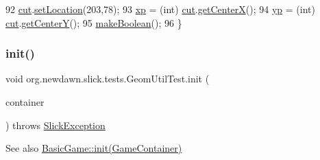 \begin{DoxyCode}
92         \mbox{\hyperlink{classorg_1_1newdawn_1_1slick_1_1tests_1_1_geom_util_test_abb232621689f77335ad9a620f991adf8}{cut}}.\mbox{\hyperlink{classorg_1_1newdawn_1_1slick_1_1geom_1_1_shape_a8dde2a46d3b696843e530545c0935a97}{setLocation}}(203,78);
93         \mbox{\hyperlink{classorg_1_1newdawn_1_1slick_1_1tests_1_1_geom_util_test_a8130a979872cdb74e28a21b5402fae21}{xp}} = (int) \mbox{\hyperlink{classorg_1_1newdawn_1_1slick_1_1tests_1_1_geom_util_test_abb232621689f77335ad9a620f991adf8}{cut}}.\mbox{\hyperlink{classorg_1_1newdawn_1_1slick_1_1geom_1_1_shape_aa8f8cb519727d4ef8737819b4f1dd7b6}{getCenterX}}();
94         \mbox{\hyperlink{classorg_1_1newdawn_1_1slick_1_1tests_1_1_geom_util_test_ab16aa08bab948180648dbf25d62810cf}{yp}} = (int) \mbox{\hyperlink{classorg_1_1newdawn_1_1slick_1_1tests_1_1_geom_util_test_abb232621689f77335ad9a620f991adf8}{cut}}.\mbox{\hyperlink{classorg_1_1newdawn_1_1slick_1_1geom_1_1_shape_a9937c71e414375a9974c7a5d8fcc06e5}{getCenterY}}();
95         \mbox{\hyperlink{classorg_1_1newdawn_1_1slick_1_1tests_1_1_geom_util_test_a8e0c0356060376434cac5a5740a2ad01}{makeBoolean}}();
96     \}
\end{DoxyCode}
\mbox{\label{classorg_1_1newdawn_1_1slick_1_1tests_1_1_geom_util_test_a5b6ee1ff7e95351dfcaf030a6430025d}} 
\subsubsection{\texorpdfstring{init()}{init()}\hspace{0.1cm}{\footnotesize\ttfamily [2/2]}}
{\footnotesize\ttfamily void org.\+newdawn.\+slick.\+tests.\+Geom\+Util\+Test.\+init (\begin{DoxyParamCaption}\item[{\mbox{\hyperlink{classorg_1_1newdawn_1_1slick_1_1_game_container}{Game\+Container}}}]{container }\end{DoxyParamCaption}) throws \mbox{\hyperlink{classorg_1_1newdawn_1_1slick_1_1_slick_exception}{Slick\+Exception}}\hspace{0.3cm}{\ttfamily [inline]}}

\begin{DoxySeeAlso}{See also}
\mbox{\hyperlink{classorg_1_1newdawn_1_1slick_1_1_basic_game_a8af0900217e4d389249f71367b22d114}{Basic\+Game\+::init(\+Game\+Container)}} 
\end{DoxySeeAlso}


